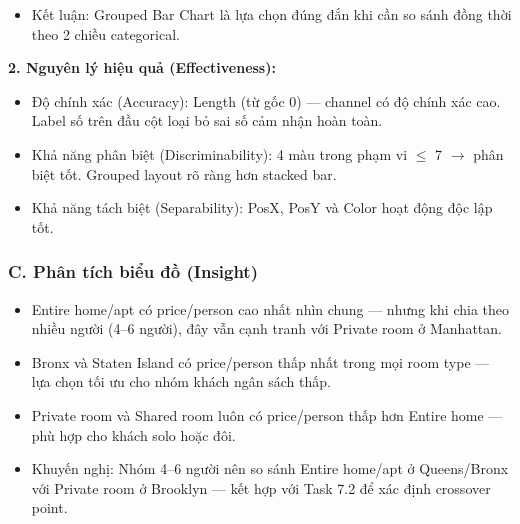 \begin{itemize}
\begin{itemize}
        \item Ưu tiên 3 -- Màu sắc (Color Hue): Color Hue mã hóa Room Type (Categorical/Nominal), xác định cấu trúc grouped bên trong mỗi borough. Theo Mackinlay, Color Hue phù hợp cho dữ liệu danh mục, đặc biệt khi cần phân biệt các nhóm nhỏ trong cùng một vị trí ngang. Kênh này cho phép biểu đồ truyền tải đồng thời hai chiều so sánh: liên borough (theo PosX) và liên room type (theo Color Hue) trong một view duy nhất --- đây là lợi thế đặc trưng của grouped bar chart so với faceting riêng biệt.
    \end{itemize}
    \item Kết luận: Grouped Bar Chart là lựa chọn đúng đắn khi cần so sánh đồng thời theo 2 chiều categorical.
\end{itemize}

\textbf{2. Nguyên lý hiệu quả (Effectiveness):}

\begin{itemize}
    \item Độ chính xác (Accuracy): Length (từ gốc 0) --- channel có độ chính xác cao. Label số trên đầu cột loại bỏ sai số cảm nhận hoàn toàn.
    \item Khả năng phân biệt (Discriminability): 4 màu trong phạm vi $\leq$ 7 $\rightarrow$ phân biệt tốt. Grouped layout rõ ràng hơn stacked bar.
    \item Khả năng tách biệt (Separability): PosX, PosY và Color hoạt động độc lập tốt.
\end{itemize}

\subsubsection*{C. Phân tích biểu đồ (Insight)}

\begin{itemize}
    \item Entire home/apt có price/person cao nhất nhìn chung --- nhưng khi chia theo nhiều người (4--6 người), đây vẫn cạnh tranh với Private room ở Manhattan.
    \item Bronx và Staten Island có price/person thấp nhất trong mọi room type --- lựa chọn tối ưu cho nhóm khách ngân sách thấp.
    \item Private room và Shared room luôn có price/person thấp hơn Entire home --- phù hợp cho khách solo hoặc đôi.
    \item Khuyến nghị: Nhóm 4--6 người nên so sánh Entire home/apt ở Queens/Bronx với Private room ở Brooklyn --- kết hợp với Task 7.2 để xác định crossover point.
\end{itemize}

